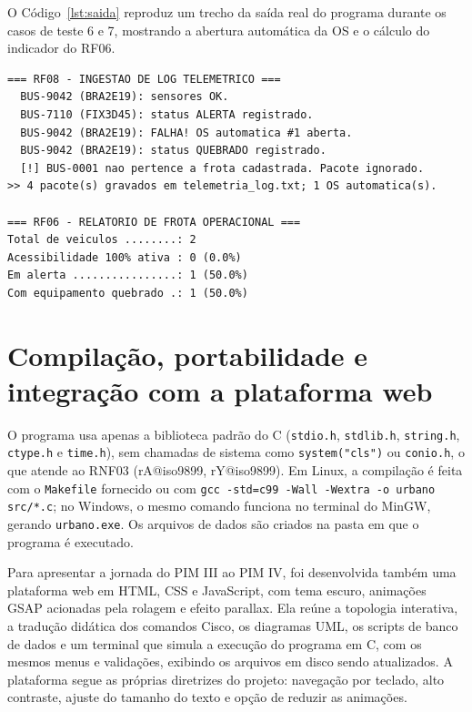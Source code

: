 \documentclass[12pt,a4paper,oneside]{report}
\makeatletter
\newcommand{\fonte}[1]{\par\vspace{2pt}{\small Fonte: #1}\par}
\renewcommand{\cite}[1]{(\csname rA@#1\endcsname, \csname rY@#1\endcsname)}
\makeatother
\begin{document}
O Código~\ref{lst:saida} reproduz um trecho da saída real do programa durante os casos de teste 6 e 7,
mostrando a abertura automática da OS e o cálculo do indicador do RF06.

\begin{lstlisting}[caption={Trecho da execução do programa},label=lst:saida,numbers=none,basicstyle=\ttfamily\scriptsize\linespread{1}\selectfont]
=== RF08 - INGESTAO DE LOG TELEMETRICO ===
  BUS-9042 (BRA2E19): sensores OK.
  BUS-7110 (FIX3D45): status ALERTA registrado.
  BUS-9042 (BRA2E19): FALHA! OS automatica #1 aberta.
  BUS-9042 (BRA2E19): status QUEBRADO registrado.
  [!] BUS-0001 nao pertence a frota cadastrada. Pacote ignorado.
>> 4 pacote(s) gravados em telemetria_log.txt; 1 OS automatica(s).

=== RF06 - RELATORIO DE FROTA OPERACIONAL ===
Total de veiculos ........: 2
Acessibilidade 100% ativa : 0 (0.0%)
Em alerta ................: 1 (50.0%)
Com equipamento quebrado .: 1 (50.0%)
\end{lstlisting}
\fonte{Elaborado pelo autor (2026).}

\section{Compilação, portabilidade e integração com a plataforma web}

O programa usa apenas a biblioteca padrão do C (\texttt{stdio.h}, \texttt{stdlib.h}, \texttt{string.h},
\texttt{ctype.h} e \texttt{time.h}), sem chamadas de sistema como \texttt{system("cls")} ou
\texttt{conio.h}, o que atende ao RNF03 \cite{iso9899}. Em Linux, a compilação é feita com o
\texttt{Makefile} fornecido ou com \texttt{gcc -std=c99 -Wall -Wextra -o urbano src/*.c}; no Windows, o
mesmo comando funciona no terminal do MinGW, gerando \texttt{urbano.exe}. Os arquivos de dados são
criados na pasta em que o programa é executado.

Para apresentar a jornada do PIM III ao PIM IV, foi desenvolvida também uma plataforma web em HTML, CSS e
JavaScript, com tema escuro, animações GSAP acionadas pela rolagem e efeito parallax. Ela reúne a
topologia interativa, a tradução didática dos comandos Cisco, os diagramas UML, os scripts de banco de
dados e um terminal que simula a execução do programa em C, com os mesmos menus e validações, exibindo os
arquivos em disco sendo atualizados. A plataforma segue as próprias diretrizes do projeto: navegação por
teclado, alto contraste, ajuste do tamanho do texto e opção de reduzir as animações.
\end{document}
